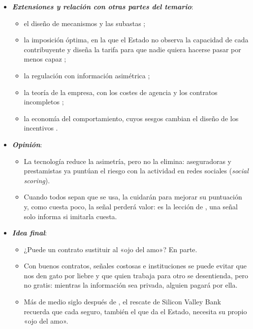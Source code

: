 \documentclass[11pt]{article}
\begin{document}
\begin{itemize}
\begin{itemize}
  \item En política, los votantes son el principal y los gobernantes el agente: no observan todo lo que hacen ni saben del todo cuán capaces son, y usan las elecciones como un contrato de incentivos, reeligiendo solo a quien da resultados suficientes\nocite{Barro1973Control,Ferejohn1986Incumbent} .
  \end{itemize}
\item \textbf{\emph{Extensiones y relación con otras partes del temario}}:
  \begin{itemize}
  \item el diseño de mecanismos y las subastas ;
  \item la imposición óptima, en la que el Estado no observa la capacidad de cada contribuyente y diseña la tarifa para que nadie quiera hacerse pasar por menos capaz\nocite{Mirrlees1971Exploration} ;
  \item la regulación con información asimétrica ;
  \item la teoría de la empresa, con los costes de agencia y los contratos incompletos ;
  \item la economía del comportamiento, cuyos sesgos cambian el diseño de los incentivos .
  \end{itemize}
\item \textbf{\emph{Opinión}}:
  \begin{itemize}
  \item La tecnología reduce la asimetría, pero no la elimina: aseguradoras y prestamistas ya puntúan el riesgo con la actividad en redes sociales (\emph{social scoring}).
  \item Cuando todos sepan que se usa, la cuidarán para mejorar su puntuación y, como cuesta poco, la señal perderá valor: es la lección de , una señal solo informa si imitarla cuesta.
  \end{itemize}
\item \textbf{\emph{Idea final}}:
  \begin{itemize}
  \item ¿Puede un contrato sustituir al «ojo del amo»? En parte.

  \item Con buenos contratos, señales costosas e instituciones se puede evitar que nos den gato por liebre y que quien trabaja para otro se desentienda, pero no gratis: mientras la información sea privada, alguien pagará por ella.

  \item Más de medio siglo después de , el rescate de Silicon Valley Bank recuerda que cada seguro, también el que da el Estado, necesita su propio «ojo del amo».
  \end{itemize}
\end{itemize}
\end{document}
